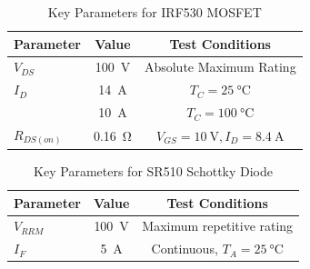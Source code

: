 \documentclass{article}
\begin{document}

\begin{table}[h]
    \centering
    \caption{Key Parameters for IRF530 MOSFET}
    \label{tab:IRF530}
    \begin{tabular}{lcc}
    \toprule
    \textbf{Parameter} & \textbf{Value} & \textbf{Test Conditions} \\
    \midrule
     $V_{DS}$ & \SI{100}{\volt} & Absolute Maximum Rating \\
     $I_D$ & \SI{14}{\ampere} & $T_C = \SI{25}{\celsius}$ \\
     & \SI{10}{\ampere} & $T_C = \SI{100}{\celsius}$ \\
     $R_{DS(on)}$ & \SI{0.16}{\ohm} & $V_{GS} = \SI{10}{\volt}, I_D = \SI{8.4}{\ampere}$ \\
    \bottomrule
    \end{tabular}
\end{table}


    \begin{table}[h]
        \centering
        \caption{Key Parameters for SR510 Schottky Diode}
        \label{tab:SR510}
        \begin{tabular}{lcc}
        \toprule
        \textbf{Parameter} & \textbf{Value} & \textbf{Test Conditions} \\
        \midrule
        $V_{RRM}$ & \SI{100}{\volt} & Maximum repetitive rating \\
        $I_F$ & \SI{5}{\ampere} & Continuous, $T_A = \SI{25}{\celsius}$ \\
        \bottomrule
        \end{tabular}
        \end{table}
\end{document}
